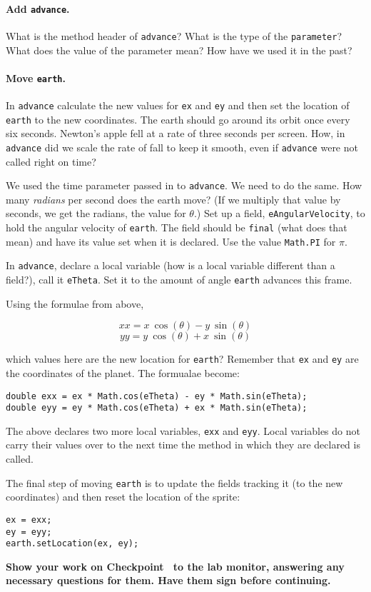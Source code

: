 \documentclass[12pt,twoside]{memoir}
\newenvironment{Checkpoint}[1]{%
\begin{Exercise}[name={Checkpoint},title={#1}]}{%
\end{Exercise}%
\textbf{Show your work on Checkpoint~\theExercise{} to the lab monitor, %
  answering any necessary questions for them.  Have them sign before continuing.}}
\begin{document}
\begin{Checkpoint}{Let there be orbit.}
\paragraph{Add \texttt{advance}.} What is the method header of
\texttt{advance}? What is the type of the \texttt{parameter}? What
does the value of the parameter mean? How have we used it in the past?

\paragraph{Move \texttt{earth}.}
In \texttt{advance} calculate the new values for \texttt{ex} and
\texttt{ey} and then set the location of \texttt{earth} to the new
coordinates. The earth should go around its orbit once every six
seconds. Newton's apple fell at a rate of three seconds per
screen. How, in \texttt{advance} did we scale the rate of fall to keep
it smooth, even if \texttt{advance} were not called right on time? 

We used the time parameter passed in to \texttt{advance}. We need to
do the same. How many \emph{radians} per second does the earth move?
(If we multiply that value by seconds, we get the radians, the value
for $\theta$.) Set up a field, \texttt{eAngularVelocity}, to hold the
angular velocity of \texttt{earth}. The field should be \texttt{final}
(what does that mean) and have its value set when it is declared. Use
the value \texttt{Math.PI} for $\pi$.

In \texttt{advance}, declare a local variable (how is a local variable
different than a field?), call it \texttt{eTheta}. Set it to the
amount of angle \texttt{earth} advances this frame. 

Using the formulae from above,

\[xx =
  x\:\cos(\theta) -
  y\:\sin(\theta)\]
\[yy =
  y\:\cos(\theta) +
  x\:\sin(\theta)\]

which values here are the new location for \texttt{earth}? Remember
that \texttt{ex} and \texttt{ey} are the coordinates of the
planet. The formualae become:

\begin{lstlisting}
double exx = ex * Math.cos(eTheta) - ey * Math.sin(eTheta);
double eyy = ey * Math.cos(eTheta) + ex * Math.sin(eTheta);
\end{lstlisting}

The above declares two more local variables, \texttt{exx} and
\texttt{eyy}. Local variables do not carry their values over to the
next time the method in which they are declared is called.

The final step of moving \texttt{earth} is to update the fields
tracking it (to the new coordinates) and then reset the location of
the sprite:
\begin{lstlisting}
ex = exx;
ey = eyy;
earth.setLocation(ex, ey);
\end{lstlisting}
\end{Checkpoint}
\end{document}
